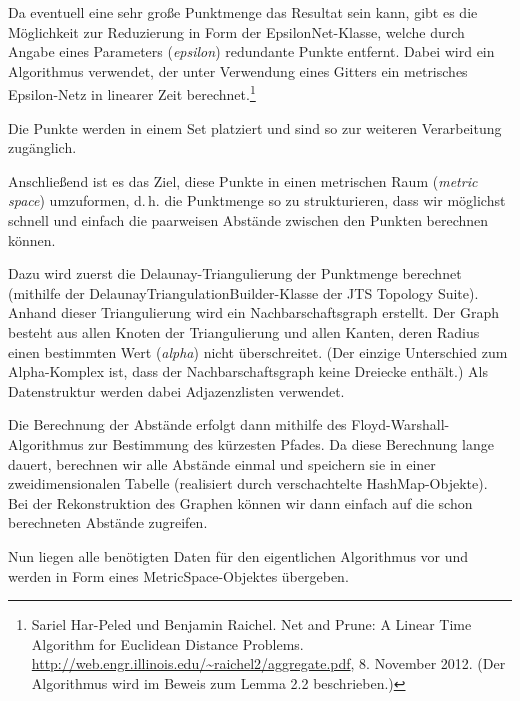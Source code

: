 \documentclass[parskip=half,
 fontsize=12pt, bibtotoc,
 ngerman]
 {article}
\begin{document}
Da eventuell eine sehr große Punktmenge das Resultat sein kann, gibt es die Möglichkeit zur Reduzierung in Form der EpsilonNet-Klasse, welche durch Angabe eines Parameters (\emph{epsilon}) redundante Punkte entfernt. Dabei wird ein Algorithmus verwendet, der unter Verwendung eines Gitters ein metrisches Epsilon-Netz in linearer Zeit berechnet.\footnote{Sariel Har-Peled und Benjamin Raichel. Net and Prune: A Linear Time Algorithm for Euclidean Distance Problems. \url{http://web.engr.illinois.edu/~raichel2/aggregate.pdf}, 8. November 2012. (Der Algorithmus wird im Beweis zum Lemma 2.2 beschrieben.)}

Die Punkte werden in einem Set platziert und sind so zur weiteren Verarbeitung zugänglich.

Anschließend ist es das Ziel, diese Punkte in einen metrischen Raum (\textit{metric space}) umzuformen, d.\,h. die Punktmenge so zu strukturieren, dass wir möglichst schnell und einfach die paarweisen Abstände zwischen den Punkten berechnen können.

Dazu wird zuerst die Delaunay-Triangulierung der Punktmenge berechnet (mithilfe der Delaunay\allowbreak TriangulationBuilder-Klasse der JTS Topology Suite). Anhand dieser Triangulierung wird ein Nachbarschaftsgraph erstellt. Der Graph besteht aus allen Knoten der Triangulierung und allen Kanten, deren Radius einen bestimmten Wert (\emph{alpha}) nicht überschreitet. (Der einzige Unterschied zum Alpha-Komplex ist, dass der Nachbarschaftsgraph keine Dreiecke enthält.) Als Datenstruktur werden dabei Adjazenzlisten verwendet.

Die Berechnung der Abstände erfolgt dann mithilfe des Floyd-Warshall-Algorithmus zur Bestimmung des kürzesten Pfades. Da diese Berechnung lange dauert, berechnen wir alle Abstände einmal und speichern sie in einer zweidimensionalen Tabelle (realisiert durch verschachtelte HashMap-Objekte). Bei der Rekonstruktion des Graphen können wir dann einfach auf die schon berechneten Abstände zugreifen.

Nun liegen alle benötigten Daten für den eigentlichen Algorithmus vor und werden in Form eines MetricSpace-Objektes übergeben.
\end{document}
